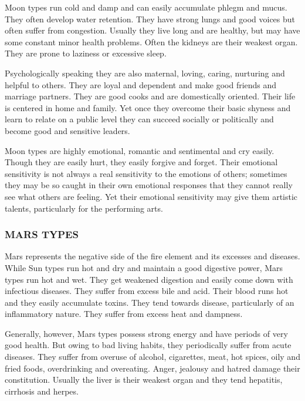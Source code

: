  

Moon types run cold and damp and can easily accumulate phlegm and mucus. They often develop water retention. They have strong lungs and good voices but often suffer from congestion. Usually they live long and are healthy, but may have some constant minor health problems. Often the kidneys are their weakest organ. They are prone to laziness or excessive sleep.

 

Psychologically speaking they are also maternal, loving, caring, nurturing and helpful to others. They are loyal and dependent and make good friends and marriage partners. They are good cooks and are domestically oriented. Their life is centered in home and family. Yet once they overcome their basic shyness and learn to relate on a public level they can succeed socially or politically and become good and sensitive leaders.

 

Moon types are highly emotional, romantic and sentimental and cry easily. Though they are easily hurt, they easily forgive and forget. Their emotional sensitivity is not always a real sensitivity to the emotions of others; sometimes they may be so caught in their own emotional responses that they cannot really see what others are feeling. Yet their emotional sensitivity may give them artistic talents, particularly for the performing arts.

 



\subsubsection{MARS TYPES}
 

Mars represents the negative side of the fire element and its excesses and diseases. While Sun types run hot and dry and maintain a good digestive power, Mars types run hot and wet. They get weakened digestion and easily come down with infectious diseases. They suffer from excess bile and acid. Their blood runs hot and they easily accumulate toxins. They tend towards disease, particularly of an inflammatory nature. They suffer from excess heat and dampness.

 

Generally, however, Mars types possess strong energy and have periods of very good health. But owing to bad living habits, they periodically suffer from acute diseases. They suffer from overuse of alcohol, cigarettes, meat, hot spices, oily and fried foods, overdrinking and overeating. Anger, jealousy and hatred damage their constitution. Usually the liver is their weakest organ and they tend hepatitis, cirrhosis and herpes.

